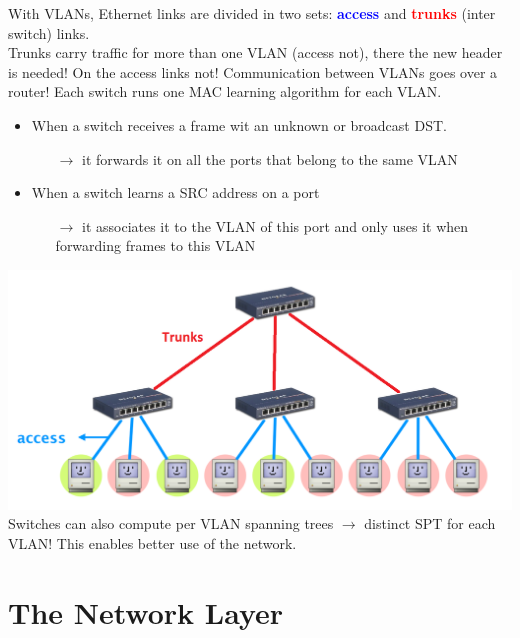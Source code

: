 \documentclass[a4paper, fontsize=8pt, landscape, DIV=1]{scrartcl}
\begin{document}
\begin{multicols*}{4}
   		With VLANs, Ethernet links are divided in two sets: \textcolor{Blue}{\textbf{access}} and \textcolor{Red}{\textbf{trunks}} (inter switch) links.\\
   		Trunks carry traffic for more than one VLAN (access not), there the new header is needed! On the access links not! Communication between VLANs goes over a router!
   		Each switch runs one MAC learning algorithm for each VLAN.
   		\begin{itemize}[noitemsep]
   			\item When a switch receives a frame wit an unknown or broadcast DST.
   			\begin{itemize}
   				\item [$\rightarrow$]	it forwards it on all the ports that belong to the same VLAN
   			\end{itemize}
   		\columnbreak
   			\item  When a switch learns a SRC address on a port
   			\begin{itemize}
   				\item [$\rightarrow$] it associates it to the VLAN of this port and only uses it when forwarding frames to this VLAN	
   			\end{itemize}
   		\end{itemize}
  		\includegraphics[width=\columnwidth]{images/Link_Layer/trunks_access.png}
   		Switches can also compute per VLAN spanning trees $\rightarrow$ distinct SPT for each VLAN! This enables better use of the network. 
   		
   		\section{The Network Layer}

\end{multicols*}
\end{document}
